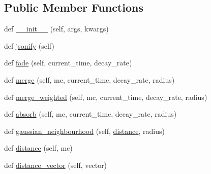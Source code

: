 \subsection*{Public Member Functions}
\begin{DoxyCompactItemize}
\item 
def \hyperlink{classMicroClusterV2_1_1MicroClusterV2_a50559c863025ce8463d76b59adfd1aa8}{\+\_\+\+\_\+init\+\_\+\+\_\+} (self, args, kwargs)
\item 
def \hyperlink{classMicroClusterV2_1_1MicroClusterV2_a4cd547bd4d1b0ba2788490beb4cae2fa}{jsonify} (self)
\item 
def \hyperlink{classMicroClusterV2_1_1MicroClusterV2_a234a2d65f93f19e61b63c851a2100e8d}{fade} (self, current\+\_\+time, decay\+\_\+rate)
\item 
def \hyperlink{classMicroClusterV2_1_1MicroClusterV2_ac364a65791f2f520e4cd0823fb8a0262}{merge} (self, mc, current\+\_\+time, decay\+\_\+rate, radius)
\item 
def \hyperlink{classMicroClusterV2_1_1MicroClusterV2_a0822b150a2634dbd38f125bd0bc5a206}{merge\+\_\+weighted} (self, mc, current\+\_\+time, decay\+\_\+rate, radius)
\item 
def \hyperlink{classMicroClusterV2_1_1MicroClusterV2_a5193c9821561863e9882bd3d9b495316}{absorb} (self, mc, current\+\_\+time, decay\+\_\+rate, radius)
\item 
def \hyperlink{classMicroClusterV2_1_1MicroClusterV2_a2217c23e0d0dc9bcf749cd9a86b42c23}{gaussian\+\_\+neighbourhood} (self, \hyperlink{classMicroClusterV2_1_1MicroClusterV2_a59c560e8a771f7dfde02ac1e144418c2}{distance}, radius)
\item 
def \hyperlink{classMicroClusterV2_1_1MicroClusterV2_a59c560e8a771f7dfde02ac1e144418c2}{distance} (self, mc)
\item 
def \hyperlink{classMicroClusterV2_1_1MicroClusterV2_a9f6bc536329f955b7d9d9df047625bea}{distance\+\_\+vector} (self, vector)
\end{DoxyCompactItemize}
